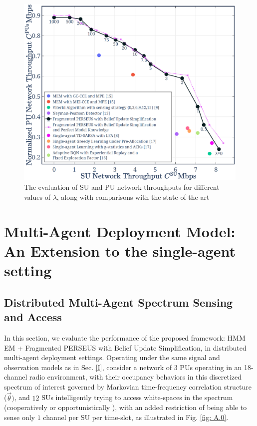 \documentclass[12pt, draftcls, onecolumn]{IEEEtran}
\begin{document}
\begin{figure} [t]
    \centerline{
    \includegraphics[width=0.8\linewidth]{figures/Minerva_Single_Agent_SoA_Comparisons_with_penalty.png}}
    \vspace{-6mm}
    \caption{The evaluation of SU and PU network throughputs for different values of $\lambda$, along with comparisons with the state-of-the-art}
    \vspace{-7mm}
    \label{Fig. 4}
\end{figure}

\section{Multi-Agent Deployment Model: An Extension to the single-agent setting}\label{Z}
\subsection{Distributed Multi-Agent Spectrum Sensing and Access}
In this section, we evaluate the performance of the proposed framework: HMM EM + Fragmented PERSEUS with Belief Update Simplification, in distributed multi-agent deployment settings. Operating under the same signal and observation models as in Sec. \ref{I}, consider a network of $3$ PUs operating in an 18-channel radio environment, with their occupancy behaviors in this discretized spectrum of interest governed by Markovian time-frequency correlation structure ($\vec{\theta})$, and $12$ SUs intelligently trying to access white-spaces in the spectrum (cooperatively \cite{WCL:5} or opportunistically \cite{WCL:MIT}), with an added restriction of being able to sense only $1$ channel per SU per time-slot, as illustrated in Fig. \ref{fig: A.0}.
\end{document}
